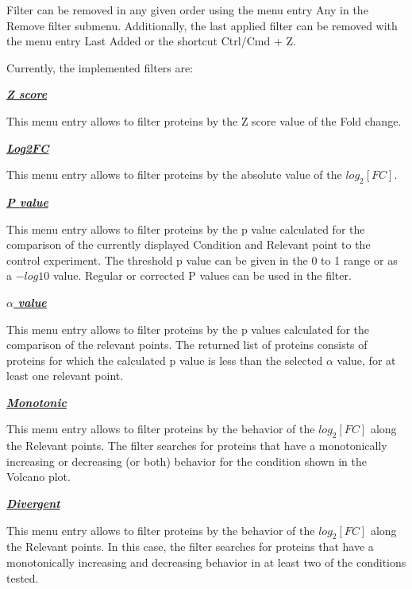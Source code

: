 Filter can be removed in any given order using the menu entry Any in the Remove filter submenu. Additionally, the last applied filter can be removed with the menu entry Last Added or the shortcut Ctrl/Cmd + Z.

Currently, the implemented filters are:

\textbf{\textit{\underline{Z score}}}

This menu entry allows to filter proteins by the Z score value of the Fold change. 

\textbf{\textit{\underline{Log2FC}}}

This menu entry allows to filter proteins by the absolute value of the $log_2[FC]$. 

\textbf{\textit{\underline{P value}}}

This menu entry allows to filter proteins by the p value calculated for the comparison of the currently displayed  Condition and Relevant point to the control experiment. The threshold p value can be given in the 0 to 1 range or as a $-log10$ value. Regular or corrected P values can be used in the filter.

\textbf{\textit{\underline{$\alpha$ value}}}

This menu entry allows to filter proteins by the p values calculated for the comparison of the relevant points. The returned list of proteins consists of proteins for which the calculated p value is less than the selected $\alpha$ value, for at least one relevant point.

\textbf{\textit{\underline{Monotonic}}}

This menu entry allows to filter proteins by the behavior of the $log_2[FC]$ along the Relevant points. The filter searches for proteins that have a monotonically increasing or decreasing (or both) behavior for the condition shown in the Volcano plot. 

\textbf{\textit{\underline{Divergent}}}

This menu entry allows to filter proteins by the behavior of the $log_2[FC]$ along the Relevant points. In this case, the filter searches for proteins that have a monotonically increasing and decreasing behavior in at least two of the conditions tested.





































